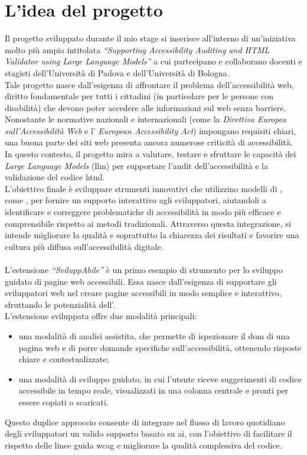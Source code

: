 \section{L'idea del progetto}
\noindent Il progetto sviluppato durante il mio stage si inserisce all’interno di un’iniziativa molto più ampia intitolata \textit{“Supporting Accessibility Auditing and HTML Validator using Large Language Models”} a cui partecipano e collaborano docenti e stagisti dell’Università di Padova e dell’Università di Bologna.\\
Tale progetto nasce dall’esigenza di affrontare il problema dell’accessibilità web, diritto fondamentale per tutti i cittadini (in particolare per le persone con disabilità) che devono poter accedere alle informazioni sul web senza barriere.\\
Nonostante le normative nazionali e internazionali (come la \textit{Direttiva Europea sull'Accessibilità Web} e l' \textit{European Accessibility Act}) impongano requisiti chiari, una buona parte dei siti web presenta ancora numerose criticità di accessibilità.\\
In questo contesto, il progetto mira a valutare, testare e sfruttare le capacità dei \textit{Large Language Models} (\acrshort{llm}) per supportare l’audit dell’accessibilità e la validazione del codice \acrshort{html}.\\
L’obiettivo finale è sviluppare strumenti innovativi che utilizzino modelli di , come , per fornire un supporto interattivo agli sviluppatori, aiutandoli a identificare e correggere problematiche di accessibilità in modo più efficace e comprensibile rispetto ai metodi tradizionali. Attraverso questa integrazione, si intende migliorare la qualità e soprattutto la chiarezza dei risultati e favorire una cultura più diffusa sull’accessibilità digitale.\\
\\
L’estensione \textit{“SviluppAbile”} è un primo esempio di strumento per lo sviluppo guidato di pagine web accessibili.
Essa nasce dall’esigenza di supportare gli sviluppatori web nel creare pagine accessibili in modo semplice e interattivo, sfruttando le potenzialità dell’.\\
L’estensione  sviluppata offre due modalità principali: \begin{itemize}
    \item una modalità di analisi assistita, che permette di ispezionare il \acrshort{dom} di una pagina web e di porre domande specifiche sull’accessibilità, ottenendo risposte chiare e contestualizzate; 
    \item una modalità di sviluppo guidato, in cui l’utente riceve suggerimenti di codice accessibile in tempo reale, visualizzati in una colonna centrale e pronti per essere copiati o scaricati.
\end{itemize}
Questo duplice approccio consente di integrare nel flusso di lavoro quotidiano degli sviluppatori un valido supporto basato su \acrshort{ai}, con l’obiettivo di facilitare il rispetto delle linee guida \acrshort{wcag} e migliorare la qualità complessiva del codice.

